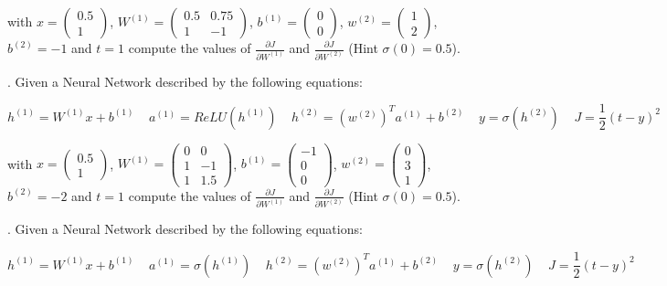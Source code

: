 \noindent with $ x = \begin{pmatrix} 0.5 \\ 1 \end{pmatrix} $, $ W^{(1)} = \begin{pmatrix} 0.5 & 0.75 \\ 1 & -1  \end{pmatrix} $, $ b^{(1)} = \begin{pmatrix} 0 \\ 0 \end{pmatrix} $, $w^{(2)} = \begin{pmatrix} 1 \\ 2 \end{pmatrix}$, $b^{(2)} = -1$ and $ t=1 $ compute the values of $ \frac{\partial J}{\partial W^{(1)}} $ and $ \frac{\partial J}{\partial W^{(2)}} $ (Hint $\sigma (0) = 0.5$).


. Given a Neural Network described by the following equations:

$$ h^{(1)} = W^{(1)}x + b^{(1)}  ~~~~~ a^{(1)} = ReLU(h^{(1)}) ~~~~~ h^{(2)} = (w^{(2)})^{T} a^{(1)} + b^{(2)} ~~~~~ y = \sigma(h^{(2)}) ~~~~~ J = \frac{1}{2} \left ( t - y \right)^{2} $$

\noindent with $ x = \begin{pmatrix} 0.5 \\ 1 \end{pmatrix} $, $ W^{(1)} = \begin{pmatrix} 0 & 0 \\ 1 & -1 \\ 1 & 1.5 \end{pmatrix} $, $ b^{(1)} = \begin{pmatrix} -1 \\ 0 \\ 0 \end{pmatrix} $, $w^{(2)} = \begin{pmatrix} 0 \\ 3 \\ 1 \end{pmatrix}$, $b^{(2)} = -2$ and $ t=1 $ compute the values of $ \frac{\partial J}{\partial W^{(1)}} $ and $ \frac{\partial J}{\partial W^{(2)}} $ (Hint $\sigma (0) = 0.5$).

. Given a Neural Network described by the following equations:

$$ h^{(1)} = W^{(1)}x + b^{(1)}  ~~~~~ a^{(1)} = \sigma(h^{(1)}) ~~~~~ h^{(2)} = (w^{(2)})^{T} a^{(1)} + b^{(2)} ~~~~~ y = \sigma(h^{(2)}) ~~~~~ J = \frac{1}{2} \left ( t - y \right)^{2} $$

